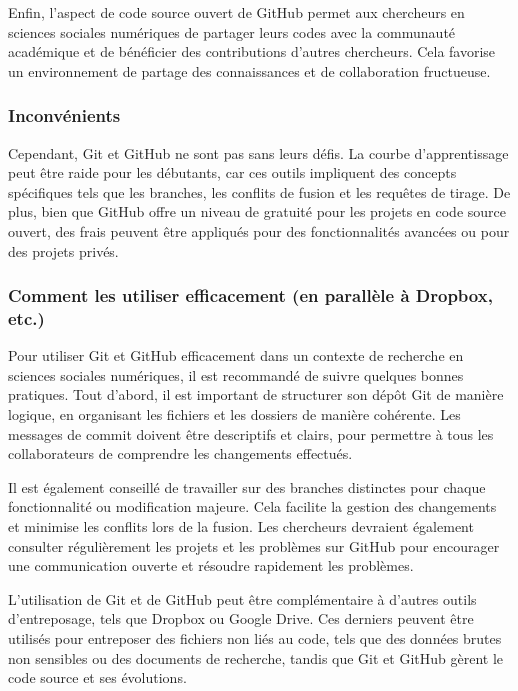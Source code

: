 \documentclass[
  letterpaper,
  DIV=11,
  numbers=noendperiod]{scrreprt}
\begin{document}
Enfin, l'aspect de code source ouvert de GitHub permet aux chercheurs en
sciences sociales numériques de partager leurs codes avec la communauté
académique et de bénéficier des contributions d'autres chercheurs. Cela
favorise un environnement de partage des connaissances et de
collaboration fructueuse.

\subsubsection{Inconvénients}\label{inconvuxe9nients}

Cependant, Git et GitHub ne sont pas sans leurs défis. La courbe
d'apprentissage peut être raide pour les débutants, car ces outils
impliquent des concepts spécifiques tels que les branches, les conflits
de fusion et les requêtes de tirage. De plus, bien que GitHub offre un
niveau de gratuité pour les projets en code source ouvert, des frais
peuvent être appliqués pour des fonctionnalités avancées ou pour des
projets privés.

\subsubsection{Comment les utiliser efficacement (en parallèle à
Dropbox,
etc.)}\label{comment-les-utiliser-efficacement-en-paralluxe8le-uxe0-dropbox-etc.}

Pour utiliser Git et GitHub efficacement dans un contexte de recherche
en sciences sociales numériques, il est recommandé de suivre quelques
bonnes pratiques. Tout d'abord, il est important de structurer son dépôt
Git de manière logique, en organisant les fichiers et les dossiers de
manière cohérente. Les messages de commit doivent être descriptifs et
clairs, pour permettre à tous les collaborateurs de comprendre les
changements effectués.

Il est également conseillé de travailler sur des branches distinctes
pour chaque fonctionnalité ou modification majeure. Cela facilite la
gestion des changements et minimise les conflits lors de la fusion. Les
chercheurs devraient également consulter régulièrement les projets et
les problèmes sur GitHub pour encourager une communication ouverte et
résoudre rapidement les problèmes.

L'utilisation de Git et de GitHub peut être complémentaire à d'autres
outils d'entreposage, tels que Dropbox ou Google Drive. Ces derniers
peuvent être utilisés pour entreposer des fichiers non liés au code,
tels que des données brutes non sensibles ou des documents de recherche,
tandis que Git et GitHub gèrent le code source et ses évolutions.
\end{document}
